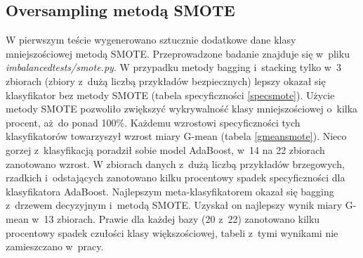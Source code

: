 \subsection{Oversampling metodą SMOTE}
W pierwszym teście wygenerowano sztucznie dodatkowe dane klasy mniejszościowej metodą SMOTE. Przeprowadzone badanie znajduje się w~pliku \textit{imbalancedtests/smote.py}. W przypadku metody bagging i~stacking tylko w~3 zbiorach (zbiory z~dużą liczbą przykładów bezpiecznych) lepszy okazał się klasyfikator bez metody SMOTE (tabela specyficzności \ref{specsmote}). Użycie metody SMOTE pozwoliło zwiększyć wykrywalność klasy mniejszościowej o~kilka procent, aż do ponad 100\%. Każdemu wzrostowi specyficzności tych klasyfikatorów towarzyszył wzrost miary G-mean (tabela \ref{gmeansmote}). Nieco gorzej z~klasyfikacją poradził sobie model AdaBoost, w~14 na 22 zbiorach zanotowano wzrost. W zbiorach danych z~dużą liczbą przykładów brzegowych, rzadkich i~odstających zanotowano kilku procentowy spadek specyficzności dla klasyfikatora AdaBoost. Najlepszym meta-klasyfikatorem okazał się bagging z~drzewem decyzyjnym i~metodą SMOTE. Uzyskał on najlepszy wynik miary G-mean w~13 zbiorach. Prawie dla każdej bazy (20 z~22) zanotowano kilku procentowy spadek czułości klasy większościowej, tabeli z~tymi wynikami nie zamieszczano w~pracy.
